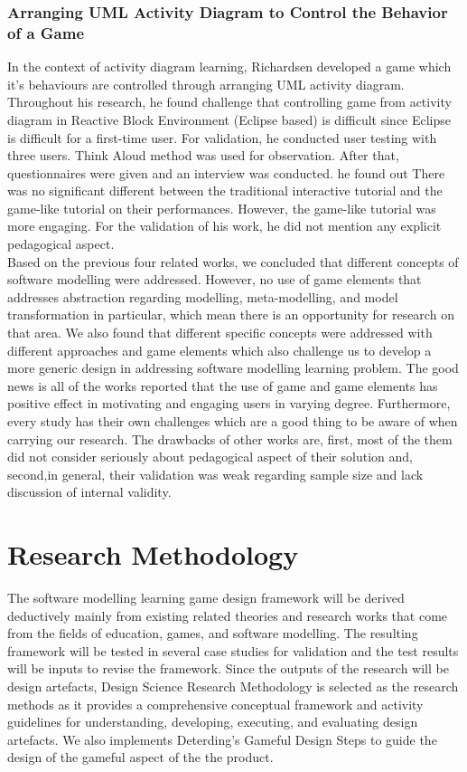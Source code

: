 \documentclass[12pt, a4paper]{report}
\begin{document}
\subsubsection{Arranging UML Activity Diagram to Control the Behavior of a Game}
In the context of activity diagram learning, Richardsen  \cite{Richardsen2014} developed a game which it's behaviours are controlled through arranging UML activity diagram. Throughout his research, he found challenge that controlling game from activity diagram in Reactive Block Environment (Eclipse based) is difficult since Eclipse is difficult for a first-time user. For validation, he conducted user testing with three users. Think Aloud method was used for observation. After that, questionnaires were given and an interview was conducted. he found out There was no significant different between the traditional interactive tutorial and the game-like tutorial on their performances. However, the game-like tutorial was more engaging. For the validation of his work, he did not mention any explicit pedagogical aspect.\\

Based on the previous four related works, we concluded that different concepts of software modelling were addressed. However, no use of game elements that addresses abstraction regarding modelling, meta-modelling, and model transformation in particular, which mean there is an opportunity for research on that area. We also found that different specific concepts were addressed with different approaches and game elements which also challenge us to develop a more generic design in addressing software modelling learning problem. The good news is all of the works reported that the use of game and game elements has positive effect in motivating and engaging users in varying degree. Furthermore, every study has their own challenges which are a good thing to be aware of when carrying our research. The drawbacks of other works are, first, most of the them did not consider seriously about pedagogical aspect of their solution and, second,in general, their validation was weak regarding sample size and lack discussion of internal validity.




\section{Research Methodology}
The software modelling learning game design framework will be derived deductively mainly from existing related theories and research works that come from the fields of education, games, and software modelling. The resulting framework will be tested in several case studies for validation and the test results will be inputs to revise the framework. Since the outputs of the research will be design artefacts, Design Science Research Methodology \cite{peffers2007design} is selected as the research methods as it provides a comprehensive conceptual framework and activity guidelines for understanding, developing, executing, and evaluating design artefacts. We also implements Deterding's Gameful Design Steps \cite{deterding2015lens} to guide the design of the gameful aspect of the the product.
\end{document}
